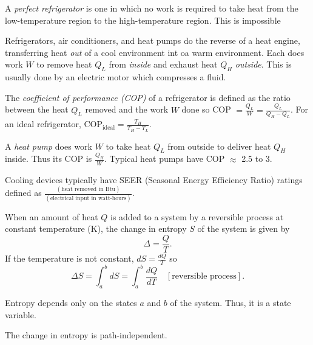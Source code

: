 \begin{definition}
    A \emph{perfect refrigerator} is one in which no work is required to take heat from the low-temperature region to the high-temperature region. This is impossible
\end{definition}
\begin{remark}
    Refrigerators, air conditioners, and heat pumps do the reverse of a heat engine, transferring heat \emph{out} of a cool environment int oa warm environment. Each does work $W$ to remove heat $Q_L$ from \emph{inside} and exhaust heat $Q_H$ \emph{outside}. This is usually done by an electric motor which compresses a fluid.
\end{remark}
\begin{definition}
    The \emph{coefficient of performance (COP)} of a refrigerator is defined as the ratio between the heat $Q_L$ removed and the work $W$ done so COP $=\frac{Q_L}{W} = \frac{Q_L}{Q_H-Q_L}$. For an ideal refrigerator, $\text{COP}_{\text{ideal}} = \frac{T_H}{T_H-T_L}.$
\end{definition}
\begin{definition}
    A \emph{heat pump} does work $W$ to take heat $Q_L$ from outside to deliver heat $Q_H$ inside. Thus its COP is $\frac{Q_H}{W}$. Typical heat pumps have COP $\approx$ 2.5 to 3.
\end{definition}
\begin{remark}
    Cooling devices typically have SEER (Seasonal Energy Efficiency Ratio) ratings defined as $\frac{(\text{heat removed in Btu})}{(\text{electrical input in watt-hours})}$.
\end{remark}
\begin{definition}[Entropy]
    When an amount of heat $Q$ is added to a system by a reversible process at constant temperature (K), the change in entropy $S$ of the system is given by $$\Delta = \frac{Q}{T}.$$ If the temperature is not constant, $dS = \frac{dQ}{T}$ so $$\Delta S = \int_a^b dS = \int_a^b \frac{dQ}{dT} \quad [\text{reversible process}].$$  
\end{definition}
\begin{definition}
    Entropy depends only on the states $a$ and $b$ of the system. Thus, it is a state variable.
\end{definition}
\begin{remark}
    The change in entropy is path-independent.
\end{remark}
